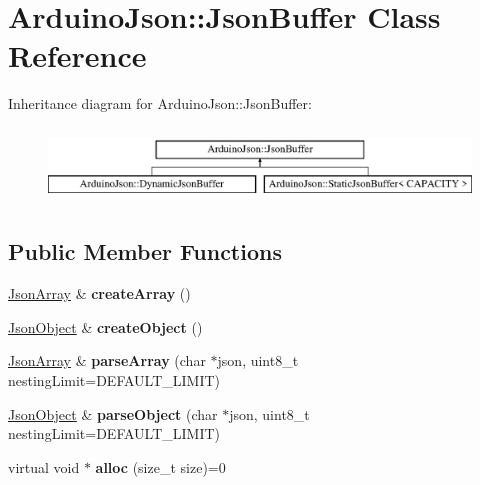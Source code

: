\hypertarget{class_arduino_json_1_1_json_buffer}{}\section{Arduino\+Json\+:\+:Json\+Buffer Class Reference}
\label{class_arduino_json_1_1_json_buffer}
Inheritance diagram for Arduino\+Json\+:\+:Json\+Buffer\+:\begin{figure}[H]
\begin{center}
\leavevmode
\includegraphics[height=2.000000cm]{class_arduino_json_1_1_json_buffer}
\end{center}
\end{figure}
\subsection*{Public Member Functions}
\begin{DoxyCompactItemize}
\item 
\hypertarget{class_arduino_json_1_1_json_buffer_aa51dc71ceab5bae1d78cfb78ef653a7e}{}\hyperlink{class_arduino_json_1_1_json_array}{Json\+Array} \& {\bfseries create\+Array} ()\label{class_arduino_json_1_1_json_buffer_aa51dc71ceab5bae1d78cfb78ef653a7e}

\item 
\hypertarget{class_arduino_json_1_1_json_buffer_a4a194d090e4175993aa0adb0d5fc8a85}{}\hyperlink{class_arduino_json_1_1_json_object}{Json\+Object} \& {\bfseries create\+Object} ()\label{class_arduino_json_1_1_json_buffer_a4a194d090e4175993aa0adb0d5fc8a85}

\item 
\hypertarget{class_arduino_json_1_1_json_buffer_a8e840e79b38d104ea6151427c82f0f2c}{}\hyperlink{class_arduino_json_1_1_json_array}{Json\+Array} \& {\bfseries parse\+Array} (char $\ast$json, uint8\+\_\+t nesting\+Limit=D\+E\+F\+A\+U\+L\+T\+\_\+\+L\+I\+M\+I\+T)\label{class_arduino_json_1_1_json_buffer_a8e840e79b38d104ea6151427c82f0f2c}

\item 
\hypertarget{class_arduino_json_1_1_json_buffer_a15ea1e1a8644fafcc955cc5fee880756}{}\hyperlink{class_arduino_json_1_1_json_object}{Json\+Object} \& {\bfseries parse\+Object} (char $\ast$json, uint8\+\_\+t nesting\+Limit=D\+E\+F\+A\+U\+L\+T\+\_\+\+L\+I\+M\+I\+T)\label{class_arduino_json_1_1_json_buffer_a15ea1e1a8644fafcc955cc5fee880756}

\item 
\hypertarget{class_arduino_json_1_1_json_buffer_a21d090da29ebf303815d11d6dc669d50}{}virtual void $\ast$ {\bfseries alloc} (size\+\_\+t size)=0\label{class_arduino_json_1_1_json_buffer_a21d090da29ebf303815d11d6dc669d50}

\end{DoxyCompactItemize}
